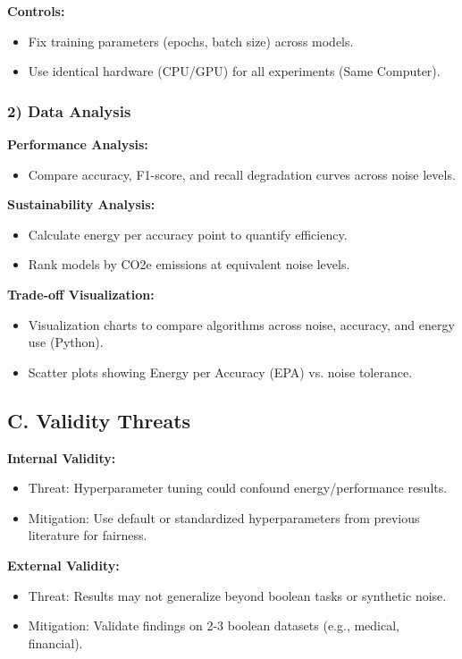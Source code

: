 \documentclass[conference]{IEEEtran}
\begin{document}
\textbf{Controls:}
\begin{itemize}
    \item Fix training parameters (epochs, batch size) across models.

    \item Use identical hardware (CPU/GPU) for all experiments (Same Computer).
\end{itemize}




\subsubsection*{2) Data Analysis}
\textbf{Performance Analysis:}
\begin{itemize}
    \item Compare accuracy, F1-score, and recall degradation curves across noise levels.
\end{itemize}

\textbf{Sustainability Analysis:}
\begin{itemize}
    \item Calculate energy per accuracy point to quantify efficiency.
    \item Rank models by CO2e emissions at equivalent noise levels.
\end{itemize}

\textbf{Trade-off Visualization:}
\begin{itemize}
    \item Visualization charts to compare algorithms across noise, accuracy, and energy use (Python).
    \item Scatter plots showing Energy per Accuracy (EPA) vs. noise tolerance.
\end{itemize}

\subsection*{C. Validity Threats}
\textbf{Internal Validity:}
\begin{itemize}
    \item Threat: Hyperparameter tuning could confound energy/performance results.
    \item Mitigation: Use default or standardized hyperparameters from previous literature for fairness.
\end{itemize}

\textbf{External Validity:}
\begin{itemize}
    \item Threat: Results may not generalize beyond boolean tasks or synthetic noise.
    \item Mitigation: Validate findings on 2-3 boolean datasets (e.g., medical, financial).
\end{itemize}
\end{document}
